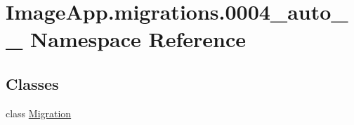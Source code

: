 \hypertarget{namespace_image_app_1_1migrations_1_10004__auto__20180819__1722}{}\section{Image\+App.\+migrations.0004\+\_\+auto\+\_\+\_ Namespace Reference}
\label{namespace_image_app_1_1migrations_1_10004__auto__20180819__1722}
\subsection*{Classes}
\begin{DoxyCompactItemize}
\item 
class \mbox{\hyperlink{class_image_app_1_1migrations_1_10004__auto__20180819__1722_1_1_migration}{Migration}}
\end{DoxyCompactItemize}
